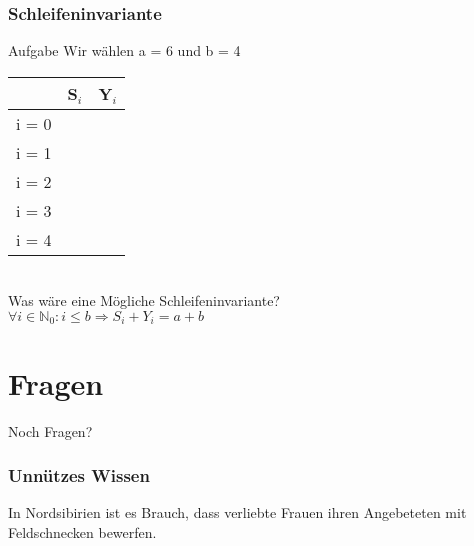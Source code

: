 \documentclass{beamer}
\newcommand{\tief}[1]{\ensuremath{\mathrm{#1}}}
\begin{document}
\begin{frame}
\frametitle{Schleifeninvariante}
	\begin{block}{Aufgabe}
		Wir wählen a = 6 und b = 4 \bigskip \\
		\begin{tabular}[c]{| c | c | c |}
			\hline
			& S$_i$ & Y$_i$ \\
			\hline
			\hline
			i = 0 & & \\
			\hline
			i = 1 & & \\
			\hline
			i = 2 & & \\
			\hline
			i = 3 & & \\
			\hline
			i = 4 & & \\
			\hline
		\end{tabular}
		\bigskip \\
		Was wäre eine Mögliche Schleifeninvariante?\\
		\pause
		$\forall i \in \tief{\mathbb{N}_0}: i \leq b \Rightarrow S_i + Y_i = a + b$
	\end{block}
\end{frame}

\section{Fragen}
\begin{frame}
	\begin{center}
		Noch Fragen?
	\end{center}
\end{frame}

\begin{frame}
\frametitle{Unnützes Wissen}
	\begin{center}
		In Nordsibirien ist es Brauch, dass verliebte Frauen ihren Angebeteten mit Feldschnecken bewerfen.
	\end{center}
\end{frame}
\end{document}

